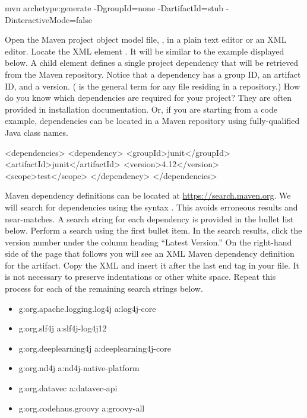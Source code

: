 \begin{example}
mvn archetype:generate -DgroupId=none -DartifactId=stub -DinteractiveMode=false
\end{example}

Open the Maven project object model file, , in a plain text editor or an XML editor. Locate the XML element . It will be similar to the example displayed below. A  child element defines a single project dependency that will be retrieved from the Maven repository. Notice that a dependency has a group ID, an artifact ID, and a version. ( is the general term for any file residing in a repository.) How do you know which dependencies are required for your project? They are often provided in installation documentation. Or, if you are starting from a code example, dependencies can be located in a Maven repository using fully-qualified Java class names.

\begin{example}
<dependencies>
  <dependency>
    <groupId>junit</groupId>
    <artifactId>junit</artifactId>
    <version>4.12</version>
    <scope>test</scope>
  </dependency>
</dependencies>
\end{example}

Maven dependency definitions can be located at \url{https://search.maven.org}. We will search for dependencies using the syntax . This avoids erroneous results and near-matches. A search string for each dependency is provided in the bullet list below. Perform a search using the first bullet item. In the search results, click the version number under the column heading ``Latest Version.'' On the right-hand side of the page that follows you will see an XML Maven dependency definition for the artifact. Copy the XML and insert it after the last  end tag in your  file. It is not necessary to preserve indentations or other white space. Repeat this process for each of the remaining search strings below.

\begin{itemize}
\item g:org.apache.logging.log4j a:log4j-core
\item g:org.slf4j a:slf4j-log4j12
\item g:org.deeplearning4j a:deeplearning4j-core
\item g:org.nd4j a:nd4j-native-platform
\item g:org.datavec a:datavec-api
\item g:org.codehaus.groovy a:groovy-all
\end{itemize}

